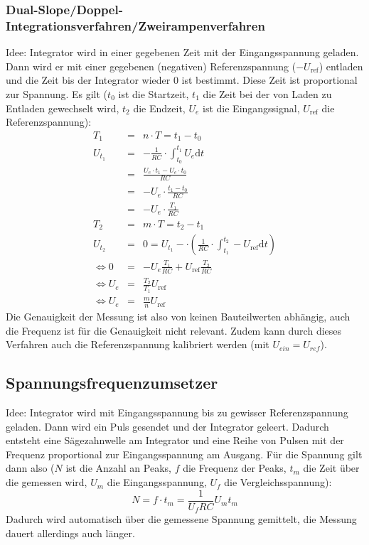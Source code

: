 \subsubsection{Dual-Slope/Doppel-Integrationsverfahren/Zweirampenverfahren}
Idee: Integrator wird in einer gegebenen Zeit mit der Eingangsspannung geladen. 
Dann wird er mit einer gegebenen (negativen) Referenzspannung ($-U_\text{ref}$) entladen und die Zeit bis der Integrator wieder $0$ ist bestimmt.
Diese Zeit ist proportional zur Spannung. Es gilt ($t_0$ ist die Startzeit, $t_1$ die Zeit bei der von Laden zu Entladen gewechselt wird, $t_2$ die Endzeit,
$U_e$ ist die Eingangssignal, $U_\text{ref}$ die Referenzspannung):
\begin{eqnarray*}
    T_1 &=& n \cdot T = t_1 - t_0 \\
    U_{t_1} &=& - \frac{1}{RC} \cdot \int_{t_0}^{t_1} U_e \text{d}t \\
    &=& \frac{U_e \cdot t_1 - U_e \cdot t_0}{RC} \\
    &=& -U_e \cdot \frac{t_1 - t_0}{RC} \\
    &=& -U_e \cdot \frac{T_1}{RC}\\
    T_2 &=& m \cdot T = t_2 - t_1 \\
    U_{t_2} &=& 0 = U_{t_1} - \cdot \left( \frac{1}{RC} \cdot \int_{t_1}^{t_2} - U_\text{ref} \text{d}t \right)\\
    \Leftrightarrow 0 &=& -U_e \frac{T_1}{RC} + U_ \text{ref} \frac{T_2}{RC} \\
    \Leftrightarrow U_e &=& \frac{T_2}{T_1} U_\text{ref} \\
    \Leftrightarrow U_e &=& \frac{m}{n} U_\text{ref}
\end{eqnarray*}
Die Genauigkeit der Messung ist also von keinen Bauteilwerten abhängig, auch die Frequenz ist für die Genauigkeit nicht relevant. 
Zudem kann durch dieses Verfahren auch die Referenzspannung kalibriert werden (mit $U_{ein} = U_{ref}$).

\subsection{Spannungsfrequenzumsetzer}
Idee: Integrator wird mit Eingangsspannung bis zu gewisser Referenzspannung geladen. Dann wird ein Puls gesendet und der Integrator geleert.
Dadurch entsteht eine Sägezahnwelle am Integrator und eine Reihe von Pulsen mit der Frequenz proportional zur Eingangsspannung am Ausgang.
Für die Spannung gilt dann also ($N$ ist die Anzahl an Peaks, $f$ die Frequenz der Peaks, $t_m$ die Zeit über die gemessen wird, $U_m$ die Eingangsspannung,
$U_f$ die Vergleichsspannung):
\begin{equation*}
    N = f \cdot t_m = \frac{1}{U_f R C} U_m t_m
\end{equation*}
Dadurch wird automatisch über die gemessene Spannung gemittelt, die Messung dauert allerdings auch länger.

